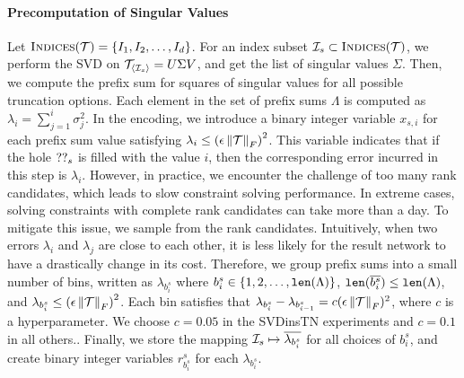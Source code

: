 \paragraph{Precomputation of Singular Values}
%
Let $\textsc{Indices}(\mathcal{T}) = \{I_1, I_2, \ldots, I_d\}$.
%
For an index subset $\mathcal{I}_s \subset \textsc{Indices}(\mathcal{T})$,
we perform the SVD on $\mathcal{T}_{\langle\mathcal{I}_s\rangle} = U \Sigma V$, and get the list of singular values $\Sigma$.
%
Then, we compute the prefix sum for squares of singular values for all possible truncation options.
%
Each element in the set of prefix sums $\Lambda$ is computed as $\lambda_{i} = \sum_{j=1}^{i} \sigma_{j}^{2}$.
%
In the encoding, we introduce a binary integer variable $x_{s,i}$ for each prefix sum value satisfying $\lambda_i \leq \left(\epsilon \left\lVert\mathcal{T}\right\rVert_{F}\right)^2$. This variable indicates that if the hole $??_s$ is filled with the value $i$, then the corresponding error incurred in this step is $\lambda_i$.
%
However, in practice, we encounter the challenge of too many rank candidates, which leads to slow constraint solving performance.
%
In extreme cases, solving constraints with complete rank candidates can take more than a day.
%
To mitigate this issue, we sample from the rank candidates.
%
Intuitively, when two errors $\lambda_i$ and $\lambda_j$ are close to each other, it is less likely for the result network to have a drastically change in its cost.
%
Therefore, we group prefix sums into a small number of bins, written as $\lambda_{b^s_i}$ where $b^s_i \in \{1,2,\ldots, \mathtt{len}(\Lambda)\}$, $\mathtt{len}(\overline{b^s_i}) \leq \mathtt{len}(\Lambda)$, and $\lambda_{b^s_i} \leq \left(\epsilon \left\lVert\mathcal{T}\right\rVert_{F}\right)^2$.
%
Each bin satisfies that $\lambda_{b^s_i} - \lambda_{b^s_{i-1}} = c (\epsilon \left\lVert\mathcal{T}\right\rVert_{F})^2$, where $c$ is a hyperparameter. We choose $c=0.05$ in the SVDinsTN experiments and $c=0.1$ in all others..
%
Finally, we store the mapping $\mathcal{I}_s \mapsto \overline{\lambda_{b^s_i}}$ for all choices of $b^s_i$, and create binary integer variables $r^s_{b^s_i}$ for each $\lambda_{b^s_i}$.

